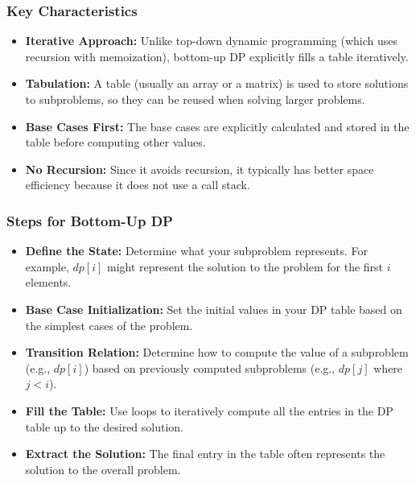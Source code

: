 \documentclass{report}
\begin{document}
\subsubsection{Key Characteristics}
\bigbreak \noindent 
\begin{itemize}
    \item \textbf{Iterative Approach:} Unlike top-down dynamic programming (which uses recursion with memoization), bottom-up DP explicitly fills a table iteratively.
    \item \textbf{Tabulation:} A table (usually an array or a matrix) is used to store solutions to subproblems, so they can be reused when solving larger problems.
    \item \textbf{Base Cases First:} The base cases are explicitly calculated and stored in the table before computing other values.
    \item \textbf{No Recursion:} Since it avoids recursion, it typically has better space efficiency because it does not use a call stack.
\end{itemize}
\bigbreak \noindent 
\subsubsection{Steps for Bottom-Up DP}
\bigbreak \noindent 
\begin{itemize}
    \item \textbf{Define the State:} Determine what your subproblem represents. For example, $dp[i]$ might represent the solution to the problem for the first $i$ elements.
    \item \textbf{Base Case Initialization:} Set the initial values in your DP table based on the simplest cases of the problem.
    \item \textbf{Transition Relation:} Determine how to compute the value of a subproblem (e.g., $dp[i]$) based on previously computed subproblems (e.g., $dp[j]$ where $j<i$).
    \item \textbf{Fill the Table:} Use loops to iteratively compute all the entries in the DP table up to the desired solution.
    \item \textbf{Extract the Solution:} The final entry in the table often represents the solution to the overall problem.
\end{itemize}

\bigbreak \noindent 
\end{document}
